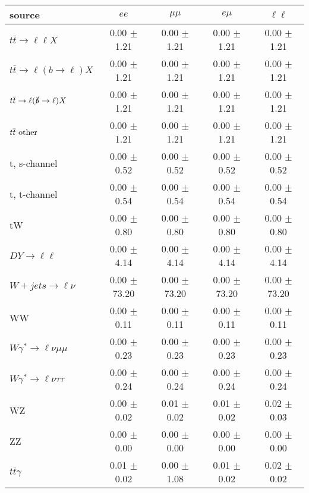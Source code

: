 \begin{tabular}{l|cccc} \hline\hline
source & $ee$ & $\mu\mu$ & $e\mu$ & $\ell\ell $ \\
\hline
$t\overline{t} \rightarrow \ell \ell X$ &  0.00 $\pm$  1.21 &  0.00 $\pm$  1.21 &  0.00 $\pm$  1.21 &  0.00 $\pm$  1.21 \\
$t\overline{t} \rightarrow \ell (b \rightarrow \ell) X$ &  0.00 $\pm$  1.21 &  0.00 $\pm$  1.21 &  0.00 $\pm$  1.21 &  0.00 $\pm$  1.21 \\
$t\overline{t} \rightarrow \ell (\slashed b \rightarrow \ell) X$ &  0.00 $\pm$  1.21 &  0.00 $\pm$  1.21 &  0.00 $\pm$  1.21 &  0.00 $\pm$  1.21 \\
        $t\overline{t}\ \rm{other}$ &  0.00 $\pm$  1.21 &  0.00 $\pm$  1.21 &  0.00 $\pm$  1.21 &  0.00 $\pm$  1.21 \\
\hline
                       t, s-channel &  0.00 $\pm$  0.52 &  0.00 $\pm$  0.52 &  0.00 $\pm$  0.52 &  0.00 $\pm$  0.52 \\
                       t, t-channel &  0.00 $\pm$  0.54 &  0.00 $\pm$  0.54 &  0.00 $\pm$  0.54 &  0.00 $\pm$  0.54 \\
                                 tW &  0.00 $\pm$  0.80 &  0.00 $\pm$  0.80 &  0.00 $\pm$  0.80 &  0.00 $\pm$  0.80 \\
\hline
         $DY \rightarrow \ell \ell$ &  0.00 $\pm$  4.14 &  0.00 $\pm$  4.14 &  0.00 $\pm$  4.14 &  0.00 $\pm$  4.14 \\
      $W+jets \rightarrow \ell \nu$ &  0.00 $\pm$ 73.20 &  0.00 $\pm$ 73.20 &  0.00 $\pm$ 73.20 &  0.00 $\pm$ 73.20 \\
                                 WW &  0.00 $\pm$  0.11 &  0.00 $\pm$  0.11 &  0.00 $\pm$  0.11 &  0.00 $\pm$  0.11 \\
\hline
$W\gamma^{*} \rightarrow \ell \nu \mu\mu$ &  0.00 $\pm$  0.23 &  0.00 $\pm$  0.23 &  0.00 $\pm$  0.23 &  0.00 $\pm$  0.23 \\
$W\gamma^{*} \rightarrow \ell \nu \tau\tau$ &  0.00 $\pm$  0.24 &  0.00 $\pm$  0.24 &  0.00 $\pm$  0.24 &  0.00 $\pm$  0.24 \\
                                 WZ &  0.00 $\pm$  0.02 &  0.01 $\pm$  0.02 &  0.01 $\pm$  0.02 &  0.02 $\pm$  0.03 \\
                                 ZZ &  0.00 $\pm$  0.00 &  0.00 $\pm$  0.00 &  0.00 $\pm$  0.00 &  0.00 $\pm$  0.00 \\
\hline
              $t\overline{t}\gamma$ &  0.01 $\pm$  0.02 &  0.00 $\pm$  1.08 &  0.01 $\pm$  0.02 &  0.02 $\pm$  0.02 \\

\end{tabular}
